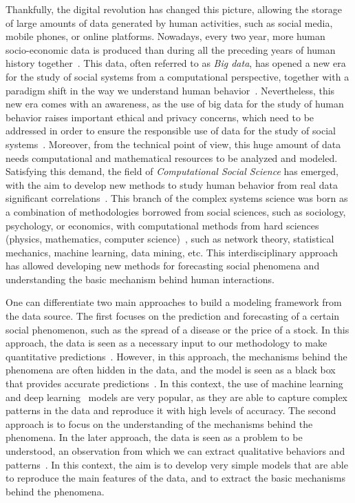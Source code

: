 Thankfully, the digital revolution has changed this picture, allowing the storage of large amounts of data generated by human activities, such as social media, mobile phones, or online platforms. Nowadays, every two year, more human socio-economic data is produced than during all the preceding years of human history together~\cite{karsai2019computational}. This data, often referred to as \textit{Big data}, has opened a new era for the study of social systems from a computational perspective, together with a paradigm shift in the way we understand human behavior~\cite{manyika-2011}. Nevertheless, this new era comes with an awareness, as the use of big data for the study of human behavior raises important ethical and privacy concerns, which need to be addressed in order to ensure the responsible use of data for the study of social systems~\cite{boyd-2012}. Moreover, from the technical point of view, this huge amount of data needs computational and mathematical resources to be analyzed and modeled. Satisfying this demand, the field of \textit{Computational Social Science} has emerged, with the aim to develop new methods to study human behavior from real data significant correlations~\cite{Lazer2009CompSocSci}. This branch of the complex systems science was born as a combination of methodologies borrowed from social sciences, such as sociology, psychology, or economics, with computational methods from hard sciences (physics, mathematics, computer science)~\cite{watts-2007}, such as network theory, statistical mechanics, machine learning, data mining, etc. This interdisciplinary approach has allowed developing new methods for forecasting social phenomena and understanding the basic mechanism behind human interactions. 

One can differentiate two main approaches to build a modeling framework from the data source. The first focuses on the prediction and forecasting of a certain social phenomenon, such as the spread of a disease or the price of a stock. In this approach, the data is seen as a necessary input to our methodology to make quantitative predictions~\cite{Lazer2009CompSocSci}. However, in this approach, the mechanisms behind the phenomena are often hidden in the data, and the model is seen as a black box that provides accurate predictions~\cite{rudin-2019}. In this context, the use of machine learning~\cite{murphy-2012} and deep learning~\cite{goodfellow-2016} models are  very popular, as they are able to capture complex patterns in the data and reproduce it with high levels of accuracy. The second approach is to focus on the understanding of the mechanisms behind the phenomena. In the later approach, the data is seen as a problem to be understood, an observation from which we can extract qualitative behaviors and patterns~\cite{axelrod2006agent}. In this context, the aim is to develop very simple models that are able to reproduce the main features of the data, and to extract the basic mechanisms behind the phenomena.

